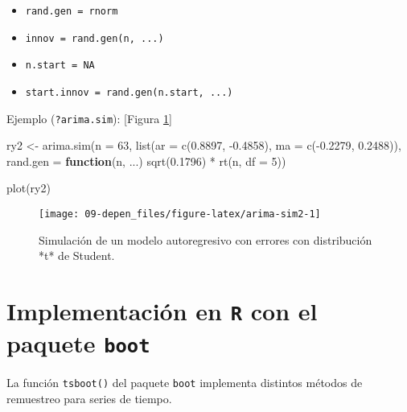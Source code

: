 \documentclass[
]{book}
\newenvironment{Shaded}{\begin{snugshade}}{\end{snugshade}}
\newcommand{\AttributeTok}[1]{\textcolor[rgb]{0.77,0.63,0.00}{#1}}
\newcommand{\ControlFlowTok}[1]{\textcolor[rgb]{0.13,0.29,0.53}{\textbf{#1}}}
\newcommand{\DecValTok}[1]{\textcolor[rgb]{0.00,0.00,0.81}{#1}}
\newcommand{\FloatTok}[1]{\textcolor[rgb]{0.00,0.00,0.81}{#1}}
\newcommand{\FunctionTok}[1]{\textcolor[rgb]{0.00,0.00,0.00}{#1}}
\newcommand{\NormalTok}[1]{#1}
\newcommand{\OtherTok}[1]{\textcolor[rgb]{0.56,0.35,0.01}{#1}}
\newcommand{\SpecialCharTok}[1]{\textcolor[rgb]{0.00,0.00,0.00}{#1}}
\theoremstyle{break}
\theoremstyle{definition}
\theoremstyle{definition}
\theoremstyle{definition}
\theoremstyle{definition}
\theoremstyle{remark}
\begin{document}
\begin{itemize}
\item
  \texttt{rand.gen\ =\ rnorm}
\item
  \texttt{innov\ =\ rand.gen(n,\ ...)}
\item
  \texttt{n.start\ =\ NA}
\item
  \texttt{start.innov\ =\ rand.gen(n.start,\ ...)}
\end{itemize}

Ejemplo (\texttt{?arima.sim}):
{[}Figura \ref{fig:arima-sim2}{]}

\begin{Shaded}
\begin{Highlighting}[]
\NormalTok{ry2 }\OtherTok{\textless{}{-}} \FunctionTok{arima.sim}\NormalTok{(}\AttributeTok{n =} \DecValTok{63}\NormalTok{, }\FunctionTok{list}\NormalTok{(}\AttributeTok{ar =} \FunctionTok{c}\NormalTok{(}\FloatTok{0.8897}\NormalTok{, }\SpecialCharTok{{-}}\FloatTok{0.4858}\NormalTok{), }
          \AttributeTok{ma =} \FunctionTok{c}\NormalTok{(}\SpecialCharTok{{-}}\FloatTok{0.2279}\NormalTok{, }\FloatTok{0.2488}\NormalTok{)),}
          \AttributeTok{rand.gen =} \ControlFlowTok{function}\NormalTok{(n, ...) }\FunctionTok{sqrt}\NormalTok{(}\FloatTok{0.1796}\NormalTok{) }\SpecialCharTok{*} \FunctionTok{rt}\NormalTok{(n, }\AttributeTok{df =} \DecValTok{5}\NormalTok{))}

\FunctionTok{plot}\NormalTok{(ry2)}
\end{Highlighting}
\end{Shaded}

\begin{figure}[!htb]

{\centering \texttt{[image: 09-depen\_files/figure-latex/arima-sim2-1]} 

}

\caption{Simulación de un modelo autoregresivo con errores con distribución *t* de Student.}\label{fig:arima-sim2}
\end{figure}

\hypertarget{implementaciuxf3n-en-r-con-el-paquete-boot}{%
\section{\texorpdfstring{Implementación en \texttt{R} con el paquete \texttt{boot}}{Implementación en R con el paquete boot}}\label{implementaciuxf3n-en-r-con-el-paquete-boot}}

La función \texttt{tsboot()} del paquete \texttt{boot} implementa distintos métodos
de remuestreo para series de tiempo.
\end{document}
